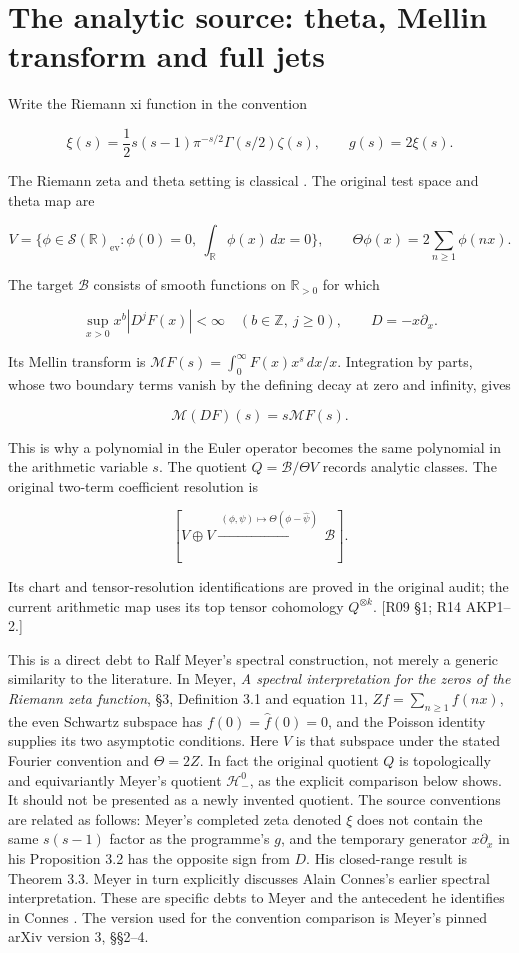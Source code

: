 \section{The analytic source: theta, Mellin transform and full jets}\label{the-analytic-source-theta-mellin-transform-and-full-jets}

Write the Riemann xi function in the convention

\[
\xi(s)=\frac12s(s-1)\pi^{-s/2}\Gamma(s/2)\zeta(s),
\qquad g(s)=2\xi(s).
\]

The Riemann zeta and theta setting is classical \cite{Riemann1859}. The original test space and theta map are

\[
V=\{\phi\in\mathcal S(\mathbb R)_{\mathrm{ev}}:
          \phi(0)=0,\ \int_{\mathbb R}\phi(x)\,dx=0\},
\qquad \Theta\phi(x)=2\sum_{n\ge1}\phi(nx).
\]

The target \(\mathscr B\) consists of smooth functions on \(\mathbb R_{>0}\) for which

\[
\sup_{x>0}x^b|D^jF(x)|<\infty
\quad(b\in\mathbb Z,\ j\ge0),\qquad D=-x\partial_x.
\]

Its Mellin transform is \(\mathcal MF(s)=\int_0^\infty F(x)x^s\,dx/x\). Integration by parts, whose two boundary terms vanish by the defining decay at zero and infinity, gives

\[
\mathcal M(DF)(s)=s\mathcal MF(s).
\]

This is why a polynomial in the Euler operator becomes the same polynomial in the arithmetic variable \(s\). The quotient \(Q=\mathscr B/\Theta V\) records analytic classes. The original two-term coefficient resolution is

\[
[V\oplus V\xrightarrow{\ (\phi,\psi)\mapsto
          \Theta(\phi-\widehat\psi)\ }\mathscr B].
\]

Its chart and tensor-resolution identifications are proved in the original audit; the current arithmetic map uses its top tensor cohomology \(Q^{\otimes k}\). {[}R09 §1; R14 AKP1--2.{]}

This is a direct debt to Ralf Meyer's spectral construction, not merely a generic similarity to the literature. In Meyer, \emph{A spectral interpretation for the zeros of the Riemann zeta function}, §3, Definition 3.1 and equation \(11\), \(Zf=\sum_{n\ge1}f(nx)\), the even Schwartz subspace has \(f(0)=\widehat f(0)=0\), and the Poisson identity supplies its two asymptotic conditions. Here \(V\) is that subspace under the stated Fourier convention and \(\Theta=2Z\). In fact the original quotient \(Q\) is topologically and equivariantly Meyer's quotient \(\mathcal H_-^0\), as the explicit comparison below shows. It should not be presented as a newly invented quotient. The source conventions are related as follows: Meyer's completed zeta denoted \(\xi\) does not contain the same \(s(s-1)\) factor as the programme's \(g\), and the temporary generator \(x\partial_x\) in his Proposition 3.2 has the opposite sign from \(D\). His closed-range result is Theorem 3.3. Meyer in turn explicitly discusses Alain Connes's earlier spectral interpretation. These are specific debts to Meyer and the antecedent he identifies in Connes \cite{Meyer2005,Connes1999}. The version used for the convention comparison is Meyer's pinned arXiv version 3, §§2--4.


